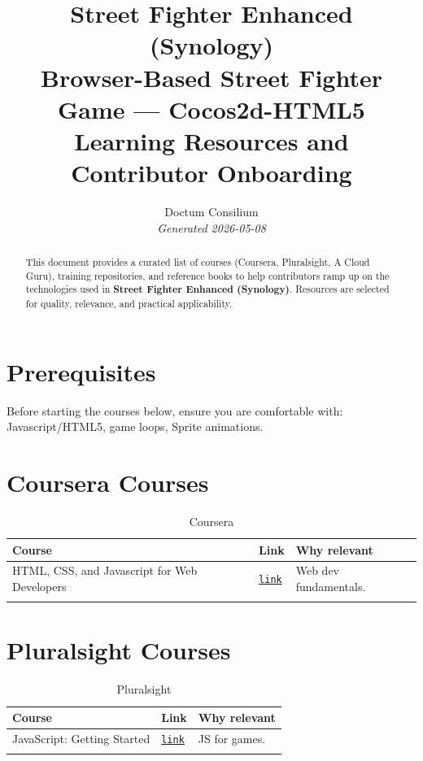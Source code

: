 \documentclass[11pt,a4paper]{article}
\begin{document}
\title{
  \textcolor{doctum}{\Large\textbf{Street Fighter Enhanced (Synology)}} \\[0.5em]
  \large Browser-Based Street Fighter Game — Cocos2d-HTML5 \\[0.3em]
  \normalsize Learning Resources and Contributor Onboarding
}
\author{Doctum Consilium \\ \small\textit{Generated 2026-05-08}}
\date{}
\maketitle
\thispagestyle{fancy}

\begin{abstract}
This document provides a curated list of courses (Coursera, Pluralsight, A Cloud Guru),
training repositories, and reference books to help contributors ramp up on the
technologies used in \textbf{Street Fighter Enhanced (Synology)}.
Resources are selected for quality, relevance, and practical applicability.
\end{abstract}

\tableofcontents
\newpage

\section{Prerequisites}
Before starting the courses below, ensure you are comfortable with:
Javascript/HTML5, game loops, Sprite animations.

\section{Coursera Courses}
\begin{longtable}{p{6cm} p{1.5cm} p{7cm}}
\toprule
\textbf{Course} & \textbf{Link} & \textbf{Why relevant} \\
\midrule
\endhead
  HTML, CSS, and Javascript for Web Developers & \href{https://www.coursera.org/learn/html-css-javascript-for-web-developers}{\texttt{link}} & Web dev fundamentals. \\
\bottomrule
\caption{Coursera}
\end{longtable}


\section{Pluralsight Courses}
\begin{longtable}{p{6cm} p{1.5cm} p{7cm}}
\toprule
\textbf{Course} & \textbf{Link} & \textbf{Why relevant} \\
\midrule
\endhead
  JavaScript: Getting Started & \href{https://www.pluralsight.com/courses/javascript-getting-started}{\texttt{link}} & JS for games. \\
\bottomrule
\caption{Pluralsight}
\end{longtable}
\end{document}

